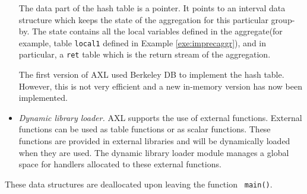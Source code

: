 \begin{itemize}
The data part of the hash table is a pointer. It points to an interval
data structure which keeps the state of the aggregation for this
particular group-by. The state contains all the local variables
defined in the aggregate(for example, table {\tt local1} defined in
Example \ref{exe:imprecaggr}), and in particular, a {\tt ret} table
which is the return stream of the aggregation.

The first version of AXL used Berkeley DB to implement the hash table.
However, this is not very efficient and a new in-memory version has
now been implemented.

\item {\it Dynamic library loader.} AXL supports the use of external
  functions. External functions can be used as table functions or as
  scalar functions. These functions are provided in external libraries
  and will be dynamically loaded when they are used. The dynamic
  library loader module manages a global space for handlers allocated
  to these external functions.
\end{itemize}

These data structures are deallocated upon leaving the function {\tt
  main()}.

